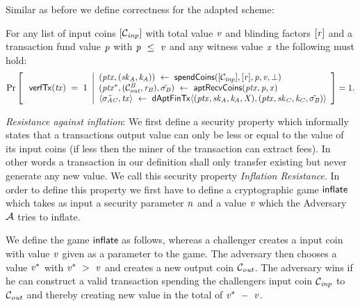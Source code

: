 Similar as before we define correctness for the adapted scheme:

\begin{definition}
    \label{def:apt-tx-scheme-correctness}
    For any list of input coins $[\mathcal{C}_{\mathit{inp}}]$ with total value $\mathit{v}$ and blinding factors
    $[\mathit{r}]$ and a transaction fund value $\mathit{p}$ with $\mathit{p} ~\leq~ \mathit{v}$ and any witness value $\mathit{x}$ the following must hold:
    \[
        \Pr\left[
        \begin{array}{c}
            \: \mathsf{verfTx}(\mathit{tx}) ~=~ 1
        \end{array}
        \middle\vert
        \begin{array}{l}
            (\mathit{ptx}, (\mathit{sk}_{\mathit{A}}, \mathit{\mathit{k}_{\mathit{A}}})) ~\leftarrow~ \mathsf{spendCoins}([\mathcal{C}_{\mathit{inp}}],[\mathit{r}],\mathit{p},\mathit{v},\bot) \\
            (\mathit{ptx}^*, (\mathcal{C}_{\mathit{out}}^{\mathit{B}},\mathit{r}_{\mathit{B}}), \tilde{\sigma_{\mathit{B}}}) ~\leftarrow~ \mathsf{aptRecvCoins}(\mathit{ptx},\mathit{p},\mathit{x}) \\
            \langle \tilde{\sigma_{\mathit{A}\mathit{C}}}, \mathit{tx} \rangle ~\leftarrow~ \mathsf{dAptFinTx} \langle (\mathit{ptx},\mathit{sk}_{\mathit{A}},\mathit{\mathit{k}_{\mathit{A}}},\mathit{X}), (\mathit{ptx},\mathit{sk}_{\mathit{C}},\mathit{\mathit{k}_{\mathit{C}}},\tilde{\sigma_{\mathit{B}}}) \rangle
        \end{array}
        \right]=1.
    \]
\end{definition}

\emph{Resistance against inflation}: We first define a security property which informally states that a transactions output value can only be less or equal to the value of its input coins (if less then the miner of the transaction can extract fees).
In other words a transaction in our definition shall only transfer existing but never generate any new value. We call this security property \emph{Inflation Resistance}.
In order to define this property we first have to define a cryptographic game $\mathsf{inflate}$ which takes as input a security parameter $\mathit{n}$ and a value $\mathit{v}$ which the Adversary
$\mathcal{A}$ tries to inflate.

We define the game $\mathsf{inflate}$ as follows, whereas a challenger creates a input coin with value $\mathit{v}$ given as a parameter to the game. The adversary then chooses a value $\mathit{v}^*$ with
$\mathit{v}^* ~>~ \mathit{v}$ and creates a new output coin $\mathcal{C}_{\mathit{out}}$. The adversary wins if he can construct a valid transaction spending the challengers input coin $\mathcal{C}_{\mathit{inp}}$ to $\mathcal{C}_{\mathit{out}}$ and thereby
creating new value in the total of $\mathit{v}^* ~-~ \mathit{v}$.

